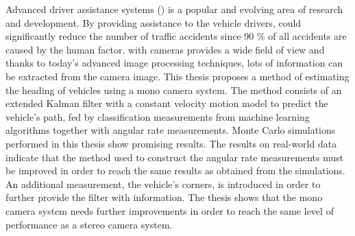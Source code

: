 Advanced driver assistance systems (\abbrADAS) is a popular and evolving area of research and development.
By providing assistance to the vehicle drivers, \abbrADAS could significantly reduce the number of traffic accidents since 90 \% of all accidents are caused by the human factor.
\abbrADAS with cameras provides a wide field of view and thanks to today's advanced image processing techniques, lots of information can be extracted from the camera image.
This thesis proposes a method of estimating the heading of vehicles using a mono camera system.
The method consists of an extended Kalman filter with a constant velocity motion model to predict the vehicle's path, fed by classification measurements from machine learning algorithms together with angular rate measurements.
Monte Carlo simulations performed in this thesis show promising results.
The results on real-world data indicate that the method used to construct the angular rate measurements must be improved in order to reach the same results as obtained from the simulations.
An additional measurement, the vehicle's corners, is introduced in order to further provide the filter with information.
The thesis shows that the mono camera system needs further improvements in order to reach the same level of performance as a stereo camera system.
